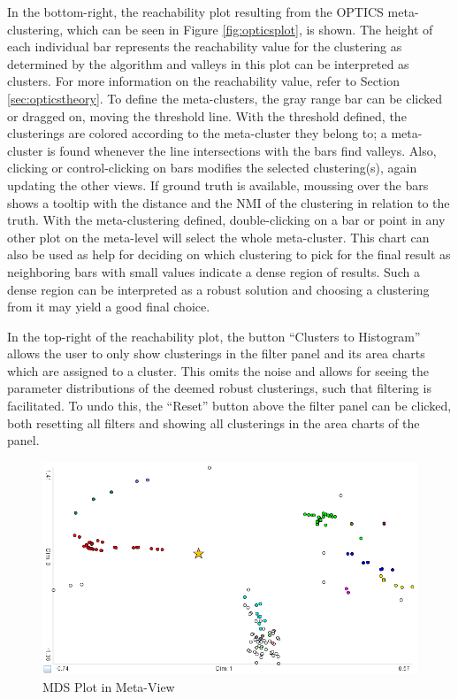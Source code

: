 \documentclass[
	a4paper,
	english,
	twoside,
	openright,               
	11pt                            
	]{report}
\begin{document}
In the bottom-right, the reachability plot resulting from the OPTICS meta-clustering, which can be seen in Figure \ref{fig:opticsplot}, is shown. The height of each individual bar represents the reachability value for the clustering as determined by the algorithm and valleys in this plot can be interpreted as clusters. For more information on the reachability value, refer to Section \ref{sec:opticstheory}. To define the meta-clusters, the gray range bar can be clicked or dragged on, moving the threshold line. With the threshold defined, the clusterings are colored according to the meta-cluster they belong to; a meta-cluster is found whenever the line intersections with the bars find valleys. Also, clicking or control-clicking on bars modifies the selected clustering(s), again updating the other views. If ground truth is available, moussing over the bars shows a tooltip with the distance and the NMI of the clustering in relation to the truth. With the meta-clustering defined, double-clicking on a bar or point in any other plot on the meta-level will select the whole meta-cluster. This chart can also be used as help for deciding on which clustering to pick for the final result as neighboring bars with small values indicate a dense region of results. Such a dense region can be interpreted as a robust solution and choosing a clustering from it may yield a good final choice. 

In the top-right of the reachability plot, the button ``Clusters to Histogram'' allows the user to only show clusterings in the filter panel and its area charts which are assigned to a cluster. This omits the noise and allows for seeing the parameter distributions of the deemed robust clusterings, such that filtering is facilitated. To undo this, the ``Reset'' button above the filter panel can be clicked, both resetting all filters and showing all clusterings in the area charts of the panel.

\begin{figure}[h]
	\centering
	\includegraphics[scale=.6]{mds-plot}
	\caption{MDS Plot in Meta-View}
	\label{fig:mdsplot}
\end{figure}
\end{document}
